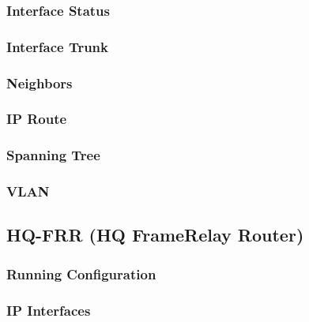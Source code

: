 \subsubsection{Interface Status}


\subsubsection{Interface Trunk}


\subsubsection{Neighbors}


\subsubsection{IP Route}


\subsubsection{Spanning Tree}


\subsubsection{VLAN}





\subsection{HQ-FRR  (HQ FrameRelay Router)}
\subsubsection{Running Configuration}


\subsubsection{IP Interfaces}


